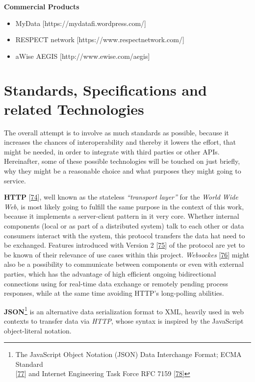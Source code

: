 \documentclass[12pt,english,a4paper,titlepage,cleardoublepage=empty,dottedtoc]{report}
\providecommand{\tightlist}{%
  \setlength{\itemsep}{0pt}\setlength{\parskip}{0pt}}
\begin{document}
\textbf{Commercial Products}

\begin{itemize}
\tightlist
\item
  MyData {[}https://mydatafi.wordpress.com/{]}
\item
  RESPECT network {[}https://www.respectnetwork.com/{]}
\item
  aWise AEGIS {[}http://www.ewise.com/aegis{]}
\end{itemize}

\section{Standards, Specifications and related
Technologies}\label{standards-specifications-and-related-technologies}

The overall attempt is to involve as much standards as possible, because
it increases the chances of interoperability and thereby it lowers the
effort, that might be needed, in order to integrate with third parties
or other APIs. Hereinafter, some of these possible technologies will be
touched on just briefly, why they might be a reasonable choice and what
purposes they might going to service.

\textbf{\protect\hypertarget{link_http}{}{HTTP}}
{[}\protect\hyperlink{ref-web_spec_http1}{74}{]}, well known as the
stateless \emph{``transport layer''} for the \emph{World Wide Web}, is
most likely going to fulfill the same purpose in the context of this
work, because it implements a server-client pattern in it very core.
Whether internal components (local or as part of a distributed system)
talk to each other or data consumers interact with the system, this
protocol transfers the data hat need to be exchanged. Features
introduced with Version 2
{[}\protect\hyperlink{ref-web_spec_http2}{75}{]} of the protocol are yet
to be known of their relevance of use cases within this project.
\emph{Websockes} {[}\protect\hyperlink{ref-web_spec_websockets}{76}{]}
might also be a possibility to communicate between components or even
with external parties, which has the advantage of high efficient ongoing
bidirectional connections using for real-time data exchange or remotely
pending process responses, while at the same time avoiding HTTP's
long-polling abilities.

\textbf{JSON}\footnote{The JavaScript Object Notation (JSON) Data
  Interchange Format; ECMA Standard\\
  {[}\protect\hyperlink{ref-web_spec_json}{77}{]} and Internet
  Engineering Task Force RFC 7159
  {[}\protect\hyperlink{ref-web_rfc_json}{78}{]}} is an alternative data
serialization format to XML, heavily used in web contexts to transfer
data via \emph{HTTP}, whose syntax is inspired by the JavaScript
object-literal notation.
\end{document}

